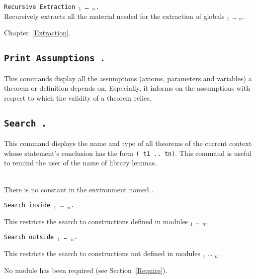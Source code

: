 \begin{Variants}
\item \texttt{Recursive Extraction {\qualid$_1$} \ldots{} {\qualid$_n$}.}\\
  Recursively extracts all the material needed for the extraction of 
  globals {\qualid$_1$} \ldots{} {\qualid$_n$}.
\end{Variants}

\SeeAlso Chapter~\ref{Extraction}.

\subsection[\tt Print Assumptions {\qualid}.]{\tt Print Assumptions {\qualid}.}
\label{PrintAssumptions}

This commands display all the assumptions (axioms, parameters and
variables) a theorem or definition depends on.  Especially, it informs
on the assumptions with respect to which the validity of a theorem
relies.

\subsection[\tt Search {\qualid}.]{\tt Search {\qualid}.}
This command displays the name and type of all theorems of the current
context whose statement's conclusion has the form {\tt ({\qualid} t1 ..
  tn)}.  This command is useful to remind the user of the name of
library lemmas.
\begin{ErrMsgs}
\item {}\\
    There is no constant in the environment named \qualid.
\end{ErrMsgs}

\begin{Variants}
\item
{\tt Search {\qualid} inside {\module$_1$} \ldots{} {\module$_n$}.}

This restricts the search to constructions defined in modules
{\module$_1$} \ldots{} {\module$_n$}.

\item {\tt Search {\qualid} outside {\module$_1$} \ldots{} {\module$_n$}.}

This restricts the search to constructions not defined in modules
{\module$_1$} \ldots{} {\module$_n$}.

\begin{ErrMsgs}
\item {}
No module \module{} has been required (see Section~\ref{Require}).
\end{ErrMsgs}

\end{Variants}

